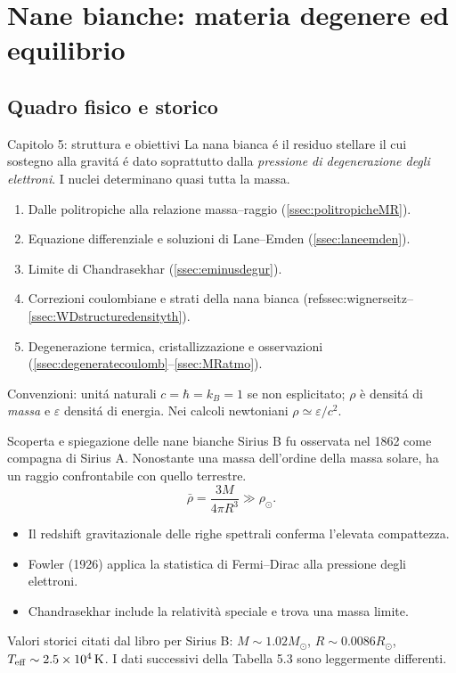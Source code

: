 
\section{Nane bianche: materia degenere ed equilibrio}

\subsection{Quadro fisico e storico}

\begin{frame}[t]{Capitolo 5: struttura e obiettivi}
\small
La nana bianca \'e il residuo stellare il cui sostegno alla gravit\'a \'e dato soprattutto dalla \emph{pressione di degenerazione degli elettroni}. I nuclei determinano quasi tutta la massa.
\begin{enumerate}
    \item Dalle politropiche alla relazione massa--raggio (\ref{ssec:politropicheMR}).
    \item Equazione differenziale e soluzioni di Lane--Emden (\ref{ssec:laneemden}).
    \item Limite di Chandrasekhar (\ref{ssec:eminusdegur}).
    \item Correzioni coulombiane e strati della nana bianca (ref{ssec:wignerseitz}--\ref{ssec:WDstructuredensityth}).
    \item Degenerazione termica, cristallizzazione e osservazioni (\ref{ssec:degeneratecoulomb}--\ref{ssec:MRatmo}).
\end{enumerate}
Convenzioni: unit\'a naturali $c=\hbar=k_B=1$ se non esplicitato; $\rho$ è densit\'a di \emph{massa} e $\varepsilon$ densit\'a di energia. Nei calcoli newtoniani $\rho\simeq\varepsilon/c^2$.
\end{frame}

\begin{frame}[t]{Scoperta e spiegazione delle nane bianche}\label{ssec:WDhisto}
\small
Sirius B fu osservata nel 1862 come compagna di Sirius A. Nonostante una massa dell'ordine della massa solare, ha un raggio confrontabile con quello terrestre.
\[
\bar\rho=\frac{3M}{4\pi R^3}\gg\rho_{\odot}.
\]
\begin{itemize}
\item Il redshift gravitazionale delle righe spettrali conferma l'elevata compattezza.
\item Fowler (1926) applica la statistica di Fermi--Dirac alla pressione degli elettroni.
\item Chandrasekhar include la relatività speciale e trova una massa limite.
\end{itemize}
Valori storici citati dal libro per Sirius B: $M\sim1.02M_\odot$, $R\sim0.0086R_\odot$, $T_{\rm eff}\sim2.5\times10^4\,{\rm K}$. I dati successivi della Tabella 5.3 sono leggermente differenti.
\end{frame}

